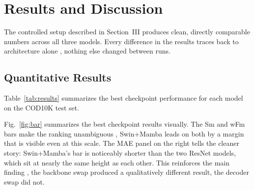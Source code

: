 \documentclass[10pt,conference]{IEEEtran}
\begin{document}
\section{Results and Discussion}
\label{result}

The controlled setup described in Section~III produces clean, directly comparable numbers across all three models. Every difference in the results traces back to architecture alone , nothing else changed between runs.

\subsection{Quantitative Results}

Table~\ref{tab:results} summarizes the best checkpoint performance for each model on the COD10K test set.

\begin{table}[t]
\centering
\caption{Best checkpoint results on COD10K test set. All models trained for 100 epochs under identical conditions. Bold indicates best performance per metric.}
\label{tab:results}

\end{table}

Fig.~\ref{fig:bar} summarizes the best checkpoint results visually. The Sm and wFm bars make the ranking unambiguous , Swin+Mamba leads on both by a margin that is visible even at this scale. The MAE panel on the right tells the cleaner story: Swin+Mamba's bar is noticeably shorter than the two ResNet models, which sit at nearly the same height as each other. This reinforces the main finding , the backbone swap produced a qualitatively different result, the decoder swap did not.
\end{document}
